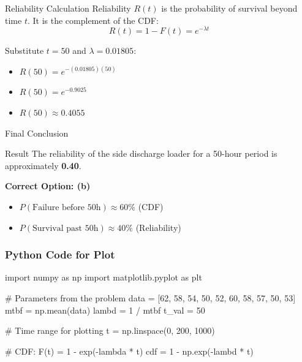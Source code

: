 \documentclass{beamer}
\begin{document}
\begin{frame}{ Reliability Calculation}
    Reliability $R(t)$ is the probability of survival beyond time $t$. It is the complement of the CDF:
    \begin{equation*}
        R(t) = 1 - F(t) = e^{-\lambda t}
    \end{equation*}

    Substitute $t = 50$ and $\lambda = 0.01805$:
    \begin{itemize}
        \item $R(50) = e^{-(0.01805)(50)}$
        \item $R(50) = e^{-0.9025}$
        \item $R(50) \approx 0.4055$
    \end{itemize}
\end{frame}


\begin{frame}{Final Conclusion}
    \begin{block}{Result}
        The reliability of the side discharge loader for a 50-hour period is approximately \textbf{0.40}.
    \end{block}
    
    \vspace{0.5cm}
    \textbf{Correct Option: (b)}
    \vfill
    \begin{itemize}
        \item $P(\text{Failure before 50h}) \approx 60\%$ (CDF)
        \item $P(\text{Survival past 50h}) \approx 40\%$ (Reliability)
    \end{itemize}
\end{frame}
\begin{frame}[fragile]
\frametitle{Python Code for Plot}

\begin{mycode}
import numpy as np
import matplotlib.pyplot as plt

# Parameters from the problem
data = [62, 58, 54, 50, 52, 60, 58, 57, 50, 53]
mtbf = np.mean(data)
lambd = 1 / mtbf
t_val = 50

# Time range for plotting
t = np.linspace(0, 200, 1000)

# CDF: F(t) = 1 - exp(-lambda * t)
cdf = 1 - np.exp(-lambd * t)




\end{mycode}

\end{frame}
\end{document}
